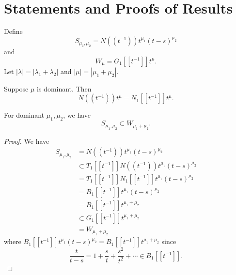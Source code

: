 \documentclass{article}
\begin{document}


\section{Statements and Proofs of Results}

Define
\[
S_{\mu_1, \mu_2} = N((t^{-1}))t^{\mu_1}(t-s)^{\mu_2}
\]
and
\[
W_\mu = G_1 [[t^{-1}]]t^\mu.
\]
Let $|\lambda| = |\lambda_1 + \lambda_2|$ and $|\mu| = |\mu_1 + \mu_2|$.


\begin{lemma}
Suppose $\mu$ is dominant. Then 
\[
N((t^{-1})) t^\mu = N_1[[t^{-1}]] t^\mu.
\]
\end{lemma}

\begin{lemma}
For dominant $\mu_1,\mu_2$, we have
\[
S_{\mu_1, \mu_2} \subset W_{\mu_1 + \mu_2}.
\]
\end{lemma}

\begin{proof}
We have
\[
\begin{split}
    S_{\mu_1, \mu_2} & = N((t^{-1}))t^{\mu_1}(t-s)^{\mu_2} \\
     & \subset T_1[[t^{-1}]] N((t^{-1})) t^{\mu_1} (t-s)^{\mu_2} \\
     & = T_1[[t^{-1}]] N_1[[t^{-1}]] t^{\mu_1} (t-s)^{\mu_2} \\
     & = B_1[[t^{-1}]] t^{\mu_1} (t-s)^{\mu_2} \\
     & = B_1[[t^{-1}]] t^{\mu_1 + \mu_2} \\
     & \subset G_1[[t^{-1}]] t^{\mu_1 + \mu_2} \\
     & = W_{\mu_1 + \mu_2}
\end{split}
\]
where $B_1[[t^{-1}]] t^{\mu_1} (t-s)^{\mu_2} = B_1[[t^{-1}]] t^{\mu_1 + \mu_2}$ since 
\[
\frac{t}{t-s} = 
1 + \frac{s}{t} + \frac{s^2}{t^2} + \cdots 
\in B_1[[t^{-1}]].
\]
\end{proof}
\end{document}
